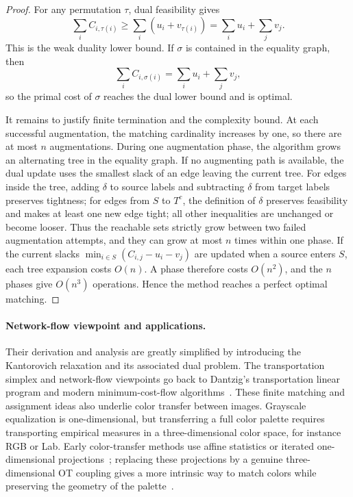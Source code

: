 \begin{proof}
	For any permutation $\tau$, dual feasibility gives
	\[
		\sum_i C_{i,\tau(i)} \geq \sum_i (u_i+v_{\tau(i)})
		= \sum_i u_i+\sum_j v_j.
	\]
	This is the weak duality lower bound. If $\sigma$ is contained in the equality graph, then
	\[
		\sum_i C_{i,\sigma(i)}
		= \sum_i u_i+\sum_j v_j,
	\]
	so the primal cost of $\sigma$ reaches the dual lower bound and is optimal.

	It remains to justify finite termination and the complexity bound. At each successful augmentation, the matching cardinality increases by one, so there are at most $n$ augmentations. During one augmentation phase, the algorithm grows an alternating tree in the equality graph. If no augmenting path is available, the dual update uses the smallest slack of an edge leaving the current tree. For edges inside the tree, adding $\delta$ to source labels and subtracting $\delta$ from target labels preserves tightness; for edges from $S$ to $T^c$, the definition of $\delta$ preserves feasibility and makes at least one new edge tight; all other inequalities are unchanged or become looser. Thus the reachable sets strictly grow between two failed augmentation attempts, and they can grow at most $n$ times within one phase. If the current slacks $\min_{i\in S}(C_{i,j}-u_i-v_j)$ are updated when a source enters $S$, each tree expansion costs $O(n)$. A phase therefore costs $O(n^2)$, and the $n$ phases give $O(n^3)$ operations. Hence the method reaches a perfect optimal matching.
\end{proof}

\paragraph{Network-flow viewpoint and applications.}

Their derivation and analysis are greatly simplified by introducing the Kantorovich relaxation and its associated dual problem. The transportation simplex and network-flow viewpoints go back to Dantzig's transportation linear program and modern minimum-cost-flow algorithms~\cite{Dantzig51,bertsekas1988dual,Orlin1997}.
%
These finite matching and assignment ideas also underlie color transfer between images. Grayscale equalization is one-dimensional, but transferring a full color palette requires transporting empirical measures in a three-dimensional color space, for instance RGB or Lab. Early color-transfer methods use affine statistics or iterated one-dimensional projections~\cite{reinhard2001color,pitie2005n}; replacing these projections by a genuine three-dimensional OT coupling gives a more intrinsic way to match colors while preserving the geometry of the palette~\cite{rabin-ssvm-11}.
